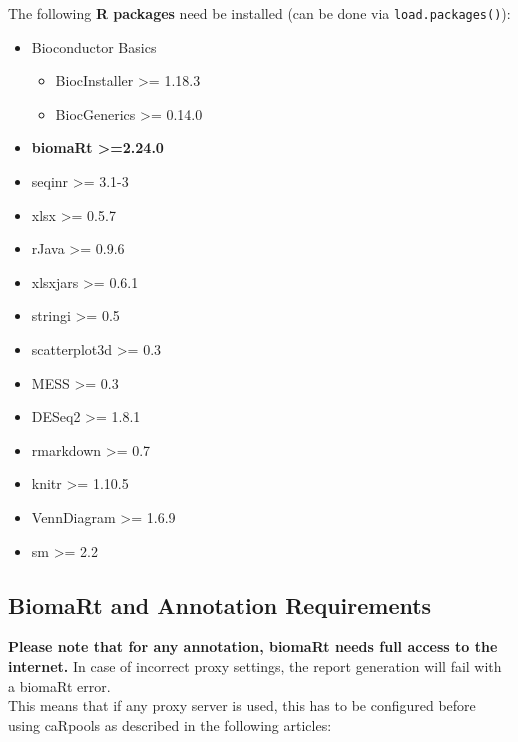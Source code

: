 \documentclass[]{article}
\providecommand{\tightlist}{%
  \setlength{\itemsep}{0pt}\setlength{\parskip}{0pt}}
\begin{document}
The following \textbf{R packages} need be installed (can be done via
\texttt{load.packages()}):

\begin{itemize}
\tightlist
\item
  Bioconductor Basics

  \begin{itemize}
  \tightlist
  \item
    BiocInstaller \textgreater{}= 1.18.3
  \item
    BiocGenerics \textgreater{}= 0.14.0
  \end{itemize}
\item
  \textbf{biomaRt \textgreater{}=2.24.0}
\item
  seqinr \textgreater{}= 3.1-3
\item
  xlsx \textgreater{}= 0.5.7
\item
  rJava \textgreater{}= 0.9.6
\item
  xlsxjars \textgreater{}= 0.6.1
\item
  stringi \textgreater{}= 0.5
\item
  scatterplot3d \textgreater{}= 0.3
\item
  MESS \textgreater{}= 0.3
\item
  DESeq2 \textgreater{}= 1.8.1
\item
  rmarkdown \textgreater{}= 0.7
\item
  knitr \textgreater{}= 1.10.5
\item
  VennDiagram \textgreater{}= 1.6.9
\item
  sm \textgreater{}= 2.2
\end{itemize}

\subsection{BiomaRt and Annotation
Requirements}\label{biomart-and-annotation-requirements}

\textbf{Please note that for any annotation, biomaRt needs full access
to the internet.} In case of incorrect proxy settings, the report
generation will fail with a biomaRt error.\\
This means that if any proxy server is used, this has to be configured
before using caRpools as described in the following articles:
\end{document}
